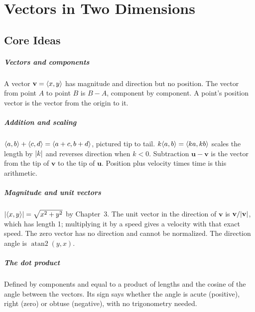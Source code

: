 \chapter{Vectors in Two Dimensions}


\section{Core Ideas}

\paragraph{Vectors and components} A vector $\mathbf{v} = \langle x, y \rangle$ has magnitude and direction but no position. The vector from point $A$ to point $B$ is $B - A$, component by component. A point's position vector is the vector from the origin to it.

\paragraph{Addition and scaling} $\langle a, b \rangle + \langle c, d \rangle = \langle a + c, b + d \rangle$, pictured tip to tail. $k\langle a, b \rangle = \langle ka, kb \rangle$ scales the length by $\lvert k \rvert$ and reverses direction when $k < 0$. Subtraction $\mathbf{u} - \mathbf{v}$ is the vector from the tip of $\mathbf{v}$ to the tip of $\mathbf{u}$. Position plus velocity times time is this arithmetic.

\paragraph{Magnitude and unit vectors} $\lvert \langle x, y \rangle \rvert = \sqrt{x^2 + y^2}$ by Chapter~3. The unit vector in the direction of $\mathbf{v}$ is $\mathbf{v}/\lvert \mathbf{v} \rvert$, which has length 1; multiplying it by a speed gives a velocity with that exact speed. The zero vector has no direction and cannot be normalized. The direction angle is $\operatorname{atan2}(y, x)$.

\paragraph{The dot product} Defined by components and equal to a product of lengths and the cosine of the angle between the vectors. Its sign says whether the angle is acute (positive), right (zero) or obtuse (negative), with no trigonometry needed.

